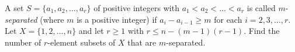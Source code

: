 A set $S=\{a_1,a_2,\dots,a_r\}$ of positive integers with $a_1<a_2<\dots<a_r$ is called $m$-\emph{separated} (where $m$ is a positive integer) if $a_i-a_{i-1}\ge m$ for each $i=2,3,\dots,r$. Let $X=\{1,2,\dots,n\}$ and let $r\ge1$ with $r\le n-(m-1)(r-1)$. Find the number of $r$-element subsets of $X$ that are $m$-separated.
